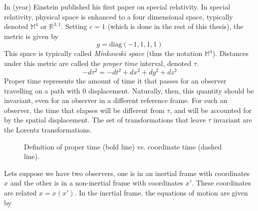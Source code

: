 In (year) Einstein published his first paper on special relativity. In special relativity, physical space is enhanced to a four dimensional space, typically denoted $\mathbb{M}^4$ or $\mathbb{R}^{3,1}$. Setting $c=1$ (which is done in the rest of this thesis), the metric is given by
\begin{equation}
    g = \text{diag}(-1,1,1,1)
\end{equation}
This space is typically called \textit{Minkowski space} (thus the notation $\mathbb{M}^4$). Distances under this metric are called the \textit{proper time} interval, denoted $\tau$.
\begin{equation}
    -d\tau^2 = -dt^2 + dx^2 + dy^2 + dz^2
\end{equation}
Proper time represents the amount of time it that passes for an observer travelling on a path with 0 displacement. Naturally, then, this quantity should be invariant, even for an observer in a different reference frame. For such an observer, the time that elapses will be different from $\tau$, and will be accounted for by the spatial displacement. The set of transformations that leave $\tau$ invariant are the Lorentz transformations.
\begin{figure}
    \centering
    \caption{Definition of proper time (bold line) vs. coordinate time (dashed line).}
\end{figure}
Lets suppose we have two observers, one is in an inertial frame with coordinates $x$ and the other is in a non-inertial frame with coordinates $x'$. These coordinates are related $x = x(x')$. In the inertial frame, the equations of motion are given by 
